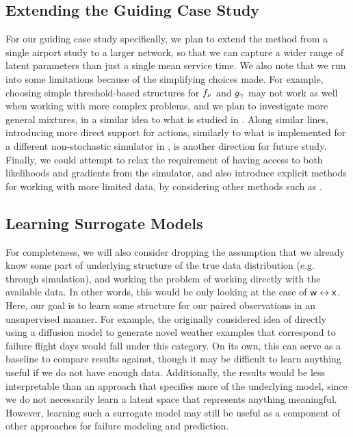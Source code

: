 \subsection{Extending the Guiding Case Study} For our guiding case study specifically, we plan to extend the method from a single airport study to a larger network, so that we can capture a wider range of latent parameters than just a single mean service time. We also note that we run into some limitations because of the simplifying choices made. For example, choosing simple threshold-based structures for $f_{\nu}$ and $g_{\gamma}$ may not work as well when working with more complex problems, and we plan to investigate more general mixtures, in a similar idea to what is studied in \cite{flowgmm2019}. Along similar lines, introducing more direct support for actions, similarly to what is implemented for a different non-stochastic simulator in \cite{michael_peng_probing_2024}, is another direction for future study. Finally, we could attempt to relax the requirement of having access to both likelihoods and gradients from the simulator, and also introduce explicit methods for working with more limited data, by considering other methods such as \cite{parashar2024failure, maurya2016, dawson2024breaking}.

\subsection{Learning Surrogate Models}

For completeness, we will also consider dropping the assumption that we already know some part of underlying structure of the true data distribution (e.g. through simulation), and working the problem of working directly with the available data. In other words, this would be only looking at the case of $\mathsf w\leftrightarrow \mathsf x$. Here, our goal is to learn some structure for our paired observations in an unsupervised manner. For example, the originally considered idea of directly using a diffusion model to generate novel weather examples that correspond to failure flight days would fall under this category. On its own, this can serve as a baseline to compare results against, though it may be difficult to learn anything useful if we do not have enough data. Additionally, the results would be less interpretable than an approach that specifies more of the underlying model, since we do not necessarily learn a latent space that represents anything meaningful. However, learning such a surrogate model may still be useful as a component of other approaches for failure modeling and prediction.

